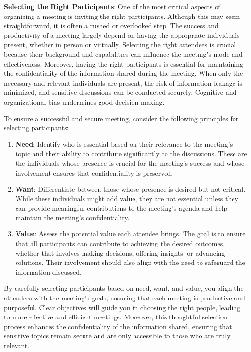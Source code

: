 \begin{spacing}{1.0}
    \newline\newline \textbf{Selecting the Right Participants}: One of the most critical aspects of organizing a meeting is inviting the right participants. Although this may seem straightforward, it is often a rushed or overlooked step. The success and productivity of a meeting largely depend on having the appropriate individuals present, whether in person or virtually. Selecting the right attendees is crucial because their background and capabilities can influence the meeting's mode and effectiveness. Moreover, having the right participants is essential for maintaining the confidentiality of the information shared during the meeting. When only the necessary and relevant individuals are present, the risk of information leakage is minimized, and sensitive discussions can be conducted securely. Cognitive and organizational bias undermines good decision-making.
    \par To ensure a successful and secure meeting, consider the following principles for selecting participants:
    \begin{enumerate}
        \item \textbf{Need}: Identify who is essential based on their relevance to the meeting's topic and their ability to contribute significantly to the discussions. These are the individuals whose presence is crucial for the meeting's success and whose involvement ensures that confidentiality is preserved.
        \item \textbf{Want}: Differentiate between those whose presence is desired but not critical. While these individuals might add value, they are not essential unless they can provide meaningful contributions to the meeting's agenda and help maintain the meeting's confidentiality.
        \item \textbf{Value}: Assess the potential value each attendee brings. The goal is to ensure that all participants can contribute to achieving the desired outcomes, whether that involves making decisions, offering insights, or advancing solutions. Their involvement should also align with the need to safeguard the information discussed.
    \end{enumerate}
    \par By carefully selecting participants based on need, want, and value, you align the attendees with the meeting’s goals, ensuring that each meeting is productive and purposeful. Clear objectives will guide you in choosing the right people, leading to more effective and efficient meetings. Moreover, this thoughtful selection process enhances the confidentiality of the information shared, ensuring that sensitive topics remain secure and are only accessible to those who are truly relevant.

\end{spacing}
